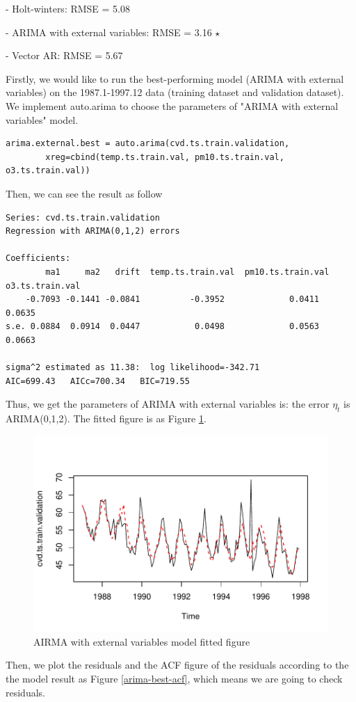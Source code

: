 \documentclass{article}
\begin{document}
\quad - Holt-winters:  RMSE = 5.08 

\quad - ARIMA with external variables:  RMSE = 3.16 $\star$

\quad - Vector AR: RMSE = 5.67

Firstly, we would like to run the best-performing model (ARIMA with external variables) on the 1987.1-1997.12 data (training dataset and validation dataset). 
We implement auto.arima to choose the parameters of 
"ARIMA with external variables" model.
\begin{lstlisting}
arima.external.best = auto.arima(cvd.ts.train.validation, 
        xreg=cbind(temp.ts.train.val, pm10.ts.train.val, o3.ts.train.val))
\end{lstlisting}
Then, we can see the result as follow
\begin{lstlisting}
Series: cvd.ts.train.validation 
Regression with ARIMA(0,1,2) errors 

Coefficients:
        ma1     ma2   drift  temp.ts.train.val  pm10.ts.train.val  o3.ts.train.val
    -0.7093 -0.1441 -0.0841          -0.3952             0.0411           0.0635
s.e. 0.0884  0.0914  0.0447           0.0498             0.0563           0.0663

sigma^2 estimated as 11.38:  log likelihood=-342.71
AIC=699.43   AICc=700.34   BIC=719.55
\end{lstlisting}
Thus, we get the parameters of ARIMA with external variables is:
the error $\eta_t$ is ARIMA(0,1,2). The fitted figure is as Figure \ref{arima-best-fit}.
\begin{figure}[H]
    \centering
    \includegraphics[width=0.65\linewidth]{images/arima-best-fit}
    \caption{AIRMA with external variables model fitted figure}
    \label{arima-best-fit}
\end{figure}
Then, we plot the residuals and the ACF figure of the residuals according to the the model result as Figure \ref{arima-best-acf}, which means we are going to check residuals. 
\end{document}
